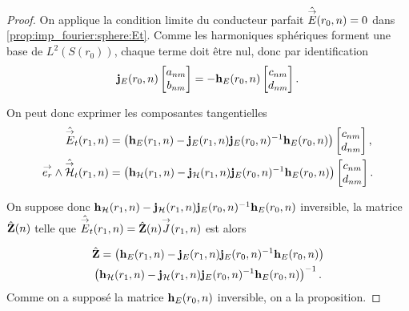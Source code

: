     \begin{proof}
      On applique la condition limite du conducteur parfait \(\hat {{\overset{\rightarrow}{E}}}(r_0,n) = 0\) dans \eqref{prop:imp_fourier:sphere:Et}. Comme les harmoniques sphériques forment une base de \(L^2(S(r_0))\), chaque terme doit être nul, donc par identification
      \begin{equation*}
        \mathbf{j}_{E}(r_0,n)
        \begin{bmatrix}
          a_{nm} \\
          b_{nm}
        \end{bmatrix}
        =-\mathbf{h}_{E}(r_0,n)
        \begin{bmatrix}
          c_{nm} \\
          d_{nm}
        \end{bmatrix}.
      \end{equation*}

      On peut donc exprimer les composantes tangentielles%
      \begin{align*}
        \hat {{\overset{\rightarrow}{E}}}_t(r_1,n) &=
        \left(\mathbf{h}_{E}(r_1,n) - \mathbf{j}_{E}(r_1,n)\mathbf{j}_{E}(r_0,n)^{-1}\mathbf{h}_{E}(r_0,n)\right)
        \begin{bmatrix}
          c_{nm} \\
          d_{nm}
        \end{bmatrix},
        \\
        {\overset{\rightarrow}{e_r}}\wedge \hat {{\overset{\rightarrow}{\mathcal{H}}}}_t(r_1,n) &=
        \left(\mathbf{h}_{\mathcal{H}}(r_1,n) - \mathbf{j}_{\mathcal{H}}(r_1,n)\mathbf{j}_{E}(r_0,n)^{-1}\mathbf{h}_{E}(r_0,n) \right)
        \begin{bmatrix}
          c_{nm} \\
          d_{nm}
        \end{bmatrix}.
      \end{align*}

      On suppose donc \(\mathbf{h}_{\mathcal{H}}(r_1,n) - \mathbf{j}_{\mathcal{H}}(r_1,n)\mathbf{j}_{E}(r_0,n)^{-1}\mathbf{h}_{E}(r_0,n)\) inversible, la matrice \(\hat{\mathbf{Z}}(n)\) telle que \(\hat{{\overset{\rightarrow}{E}}}_t(r_1,n) = \hat{\mathbf{Z}}(n) {\overset{\rightarrow}{J}}(r_1,n)\) est alors

      \begin{multline*}
        \hat {\mathbf{Z}} =
        \left(\mathbf{h}_{E}(r_1,n) - \mathbf{j}_{E}(r_1,n)\mathbf{j}_{E}(r_0,n)^{-1}\mathbf{h}_{E}(r_0,n)\right)
        \\
        \left(\mathbf{h}_{\mathcal{H}}(r_1,n) - \mathbf{j}_{\mathcal{H}}(r_1,n)\mathbf{j}_{E}(r_0,n)^{-1}\mathbf{h}_{E}(r_0,n)\right)^{-1}.
      \end{multline*}
      Comme on a supposé la matrice \(\mathbf{h}_E(r_0,n)\) inversible, on a la proposition.

    \end{proof}


